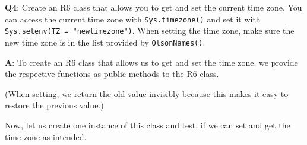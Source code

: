 \documentclass[
]{krantz}
\makeatletter
\newenvironment{Shaded}{\begin{snugshade}}{\end{snugshade}}
\newcommand{\CommentTok}[1]{\textcolor[rgb]{0.56,0.35,0.01}{\textit{#1}}}
\newcommand{\ControlFlowTok}[1]{\textcolor[rgb]{0.13,0.29,0.53}{\textbf{#1}}}
\newcommand{\DataTypeTok}[1]{\textcolor[rgb]{0.13,0.29,0.53}{#1}}
\newcommand{\KeywordTok}[1]{\textcolor[rgb]{0.13,0.29,0.53}{\textbf{#1}}}
\newcommand{\NormalTok}[1]{#1}
\newcommand{\OperatorTok}[1]{\textcolor[rgb]{0.81,0.36,0.00}{\textbf{#1}}}
\newcommand{\StringTok}[1]{\textcolor[rgb]{0.31,0.60,0.02}{#1}}
\newenvironment{kframe}{%
\medskip{}
\setlength{\fboxsep}{.8em}
 \def\at@end@of@kframe{}%
 \ifinner\ifhmode%
  \def\at@end@of@kframe{\end{minipage}}%
  \begin{minipage}{\columnwidth}%
 \fi\fi%
 \def\FrameCommand##1{\hskip\@totalleftmargin \hskip-\fboxsep
 \colorbox{shadecolor}{##1}\hskip-\fboxsep
     \hskip-\linewidth \hskip-\@totalleftmargin \hskip\columnwidth}%
 \MakeFramed {\advance\hsize-\width
   \@totalleftmargin\z@ \linewidth\hsize
   \@setminipage}}%
 {\par\unskip\endMakeFramed%
 \at@end@of@kframe}
\renewenvironment{Shaded}{\begin{kframe}}{\end{kframe}}
\renewcommand{\KeywordTok} [1]{\textcolor[rgb]{0.00,0.44,0.13}{{#1}}}
\renewcommand{\DataTypeTok}[1]{\textcolor[rgb]{0.56,0.13,0.00}{{#1}}}
\renewcommand{\StringTok}  [1]{\textcolor[rgb]{0.25,0.44,0.63}{{#1}}}
\renewcommand{\CommentTok} [1]{\textcolor[rgb]{0.38,0.63,0.69}{{#1}}}
\renewcommand{\NormalTok}  [1]{{#1}}
\makeatother
\begin{document}
\textbf{{Q4}}: Create an R6 class that allows you to get and set the current time zone. You can access the current time zone with \texttt{Sys.timezone()} and set it with \texttt{Sys.setenv(TZ\ =\ "newtimezone")}. When setting the time zone, make sure the new time zone is in the list provided by \texttt{OlsonNames()}.

\textbf{{A}}: To create an R6 class that allows us to get and set the time zone, we provide the respective functions as public methods to the R6 class.

\begin{Shaded}
\end{Shaded}

(When setting, we return the old value invisibly because this makes it easy to restore the previous value.)

Now, let us create one instance of this class and test, if we can set and get the time zone as intended.

\begin{Shaded}
\end{Shaded}
\end{document}
